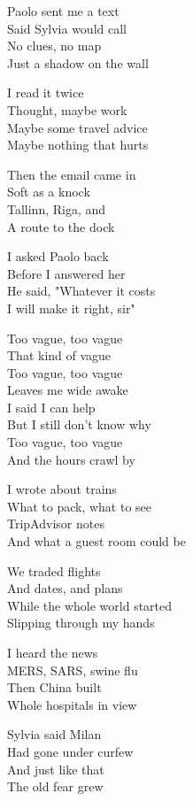 \begin{lyrics}
Paolo sent me a text\\
Said Sylvia would call\\
No clues, no map\\
Just a shadow on the wall

I read it twice\\
Thought, maybe work\\
Maybe some travel advice\\
Maybe nothing that hurts

Then the email came in\\
Soft as a knock\\
Tallinn, Riga, and\\
A route to the dock

I asked Paolo back\\
Before I answered her\\
He said, "Whatever it costs\\
I will make it right, sir"

Too vague, too vague\\
That kind of vague\\
Too vague, too vague\\
Leaves me wide awake\\
I said I can help\\
But I still don't know why\\
Too vague, too vague\\
And the hours crawl by

I wrote about trains\\
What to pack, what to see\\
TripAdvisor notes\\
And what a guest room could be

We traded flights\\
And dates, and plans\\
While the whole world started\\
Slipping through my hands

I heard the news\\
MERS, SARS, swine flu\\
Then China built\\
Whole hospitals in view

Sylvia said Milan\\
Had gone under curfew\\
And just like that\\
The old fear grew


\end{lyrics}
